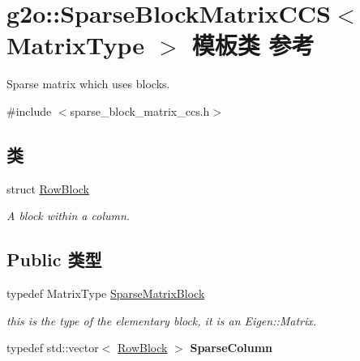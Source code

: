 \hypertarget{classg2o_1_1SparseBlockMatrixCCS}{\section{g2o\-:\-:Sparse\-Block\-Matrix\-C\-C\-S$<$ Matrix\-Type $>$ 模板类 参考}
\label{classg2o_1_1SparseBlockMatrixCCS}
}


Sparse matrix which uses blocks.  




{\ttfamily \#include $<$sparse\-\_\-block\-\_\-matrix\-\_\-ccs.\-h$>$}

\subsection*{类}
\begin{DoxyCompactItemize}
\item 
struct \hyperlink{structg2o_1_1SparseBlockMatrixCCS_1_1RowBlock}{Row\-Block}
\begin{DoxyCompactList}\small\item\em A block within a column. \end{DoxyCompactList}\end{DoxyCompactItemize}
\subsection*{Public 类型}
\begin{DoxyCompactItemize}
\item 
\hypertarget{classg2o_1_1SparseBlockMatrixCCS_a41ea1c8c9d94a25544903ae8345c0354}{typedef Matrix\-Type \hyperlink{classg2o_1_1SparseBlockMatrixCCS_a41ea1c8c9d94a25544903ae8345c0354}{Sparse\-Matrix\-Block}}\label{classg2o_1_1SparseBlockMatrixCCS_a41ea1c8c9d94a25544903ae8345c0354}

\begin{DoxyCompactList}\small\item\em this is the type of the elementary block, it is an Eigen\-::\-Matrix. \end{DoxyCompactList}\item 
\hypertarget{classg2o_1_1SparseBlockMatrixCCS_a4fc5dfe0a9ff9bd62065ca4b17f25bc1}{typedef std\-::vector$<$ \hyperlink{structg2o_1_1SparseBlockMatrixCCS_1_1RowBlock}{Row\-Block} $>$ {\bfseries Sparse\-Column}}\label{classg2o_1_1SparseBlockMatrixCCS_a4fc5dfe0a9ff9bd62065ca4b17f25bc1}

\end{DoxyCompactItemize}
